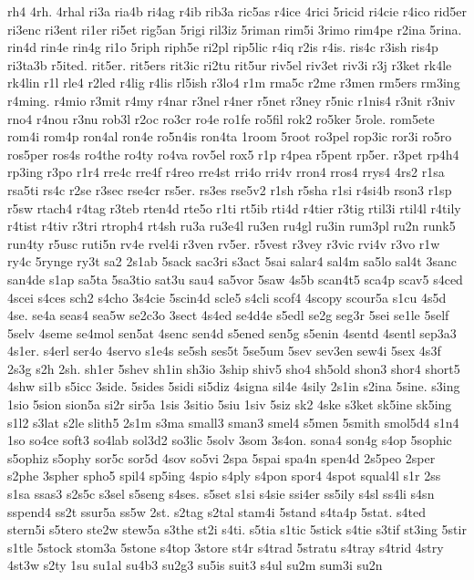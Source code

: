 {rh4
4rh.
4rhal
ri3a
ria4b
ri4ag
r4ib
rib3a
ric5as
r4ice
4rici
5ricid
ri4cie
r4ico
rid5er
ri3enc
ri3ent
ri1er
ri5et
rig5an
5rigi
ril3iz
5riman
rim5i
3rimo
rim4pe
r2ina
5rina.
rin4d
rin4e
rin4g
ri1o
5riph
riph5e
ri2pl
rip5lic
r4iq
r2is
r4is.
ris4c
r3ish
ris4p
ri3ta3b
r5ited.
rit5er.
rit5ers
rit3ic
ri2tu
rit5ur
riv5el
riv3et
riv3i
r3j
r3ket
rk4le
rk4lin
r1l
rle4
r2led
r4lig
r4lis
rl5ish
r3lo4
r1m
rma5c
r2me
r3men
rm5ers
rm3ing
r4ming.
r4mio
r3mit
r4my
r4nar
r3nel
r4ner
r5net
r3ney
r5nic
r1nis4
r3nit
r3niv
rno4
r4nou
r3nu
rob3l
r2oc
ro3cr
ro4e
ro1fe
ro5fil
rok2
ro5ker
5role.
rom5ete
rom4i
rom4p
ron4al
ron4e
ro5n4is
ron4ta
1room
5root
ro3pel
rop3ic
ror3i
ro5ro
ros5per
ros4s
ro4the
ro4ty
ro4va
rov5el
rox5
r1p
r4pea
r5pent
rp5er.
r3pet
rp4h4
rp3ing
r3po
r1r4
rre4c
rre4f
r4reo
rre4st
rri4o
rri4v
rron4
rros4
rrys4
4rs2
r1sa
rsa5ti
rs4c
r2se
r3sec
rse4cr
rs5er.
rs3es
rse5v2
r1sh
r5sha
r1si
r4si4b
rson3
r1sp
r5sw
rtach4
r4tag
r3teb
rten4d
rte5o
r1ti
rt5ib
rti4d
r4tier
r3tig
rtil3i
rtil4l
r4tily
r4tist
r4tiv
r3tri
rtroph4
rt4sh
ru3a
ru3e4l
ru3en
ru4gl
ru3in
rum3pl
ru2n
runk5
run4ty
r5usc
ruti5n
rv4e
rvel4i
r3ven
rv5er.
r5vest
r3vey
r3vic
rvi4v
r3vo
r1w
ry4c
5rynge
ry3t
sa2
2s1ab
5sack
sac3ri
s3act
5sai
salar4
sal4m
sa5lo
sal4t
3sanc
san4de
s1ap
sa5ta
5sa3tio
sat3u
sau4
sa5vor
5saw
4s5b
scan4t5
sca4p
scav5
s4ced
4scei
s4ces
sch2
s4cho
3s4cie
5scin4d
scle5
s4cli
scof4
4scopy
scour5a
s1cu
4s5d
4se.
se4a
seas4
sea5w
se2c3o
3sect
4s4ed
se4d4e
s5edl
se2g
seg3r
5sei
se1le
5self
5selv
4seme
se4mol
sen5at
4senc
sen4d
s5ened
sen5g
s5enin
4sentd
4sentl
sep3a3
4s1er.
s4erl
ser4o
4servo
s1e4s
se5sh
ses5t
5se5um
5sev
sev3en
sew4i
5sex
4s3f
2s3g
s2h
2sh.
sh1er
5shev
sh1in
sh3io
3ship
shiv5
sho4
sh5old
shon3
shor4
short5
4shw
si1b
s5icc
3side.
5sides
5sidi
si5diz
4signa
sil4e
4sily
2s1in
s2ina
5sine.
s3ing
1sio
5sion
sion5a
si2r
sir5a
1sis
3sitio
5siu
1siv
5siz
sk2
4ske
s3ket
sk5ine
sk5ing
s1l2
s3lat
s2le
slith5
2s1m
s3ma
small3
sman3
smel4
s5men
5smith
smol5d4
s1n4
1so
so4ce
soft3
so4lab
sol3d2
so3lic
5solv
3som
3s4on.
sona4
son4g
s4op
5sophic
s5ophiz
s5ophy
sor5c
sor5d
4sov
so5vi
2spa
5spai
spa4n
spen4d
2s5peo
2sper
s2phe
3spher
spho5
spil4
sp5ing
4spio
s4ply
s4pon
spor4
4spot
squal4l
s1r
2ss
s1sa
ssas3
s2s5c
s3sel
s5seng
s4ses.
s5set
s1si
s4sie
ssi4er
ss5ily
s4sl
ss4li
s4sn
sspend4
ss2t
ssur5a
ss5w
2st.
s2tag
s2tal
stam4i
5stand
s4ta4p
5stat.
s4ted
stern5i
s5tero
ste2w
stew5a
s3the
st2i
s4ti.
s5tia
s1tic
5stick
s4tie
s3tif
st3ing
5stir
s1tle
5stock
stom3a
5stone
s4top
3store
st4r
s4trad
5stratu
s4tray
s4trid
4stry
4st3w
s2ty
1su
su1al
su4b3
su2g3
su5is
suit3
s4ul
su2m
sum3i
su2n
}
